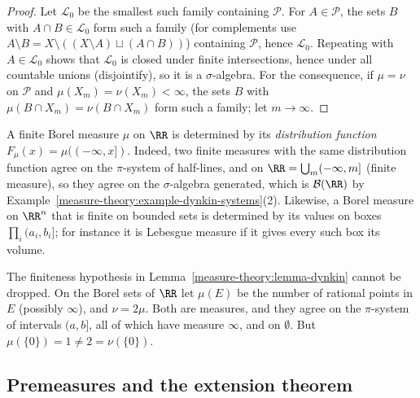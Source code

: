 \begin{proof}
Let $\mathcal{L}_0$ be the smallest such family containing $\mathcal{P}$. For $A \in \mathcal{P}$, the sets $B$ with $A \cap B \in \mathcal{L}_0$ form such a family (for complements use
$A \setminus B = X \setminus ((X \setminus A) \sqcup (A \cap B))$) containing $\mathcal{P}$, hence $\mathcal{L}_0$. Repeating with $A \in \mathcal{L}_0$ shows that $\mathcal{L}_0$ is closed under finite
intersections, hence under all countable unions (disjointify), so it is a $\sigma$-algebra. For the consequence, if $\mu = \nu$ on $\mathcal{P}$ and $\mu(X_m) = \nu(X_m) < \infty$, the sets $B$ with
$\mu(B \cap X_m) = \nu(B \cap X_m)$ form such a family; let $m \to \infty$.
\end{proof}

\begin{example}\label{measure-theory:example-distribution-function}
A finite Borel measure $\mu$ on $\RR$ is determined by its \emph{distribution function} $F_\mu(x) = \mu((-\infty, x])$. Indeed, two finite measures with the same distribution function agree on the
$\pi$-system of half-lines, and on $\RR = \bigcup_m(-\infty, m]$ (finite measure), so they agree on the $\sigma$-algebra generated, which is $\mathcal{B}(\RR)$ by
Example~\ref{measure-theory:example-dynkin-systems}(2). Likewise, a Borel measure on $\RR^n$ that is finite on bounded sets is determined by its values on boxes $\prod_i(a_i, b_i]$; for instance it
is Lebesgue measure if it gives every such box its volume.
\end{example}

\begin{counterexample}\label{measure-theory:counterexample-uniqueness}
The finiteness hypothesis in Lemma~\ref{measure-theory:lemma-dynkin} cannot be dropped. On the Borel sets of $\RR$ let $\mu(E)$ be the number of rational points in $E$ (possibly $\infty$), and
$\nu = 2\mu$. Both are measures, and they agree on the $\pi$-system of intervals $(a, b]$, all of which have measure $\infty$, and on $\emptyset$. But $\mu(\{0\}) = 1 \neq 2 = \nu(\{0\})$.
\end{counterexample}

\subsection{Premeasures and the extension theorem}\label{measure-theory:subsection-extension}

